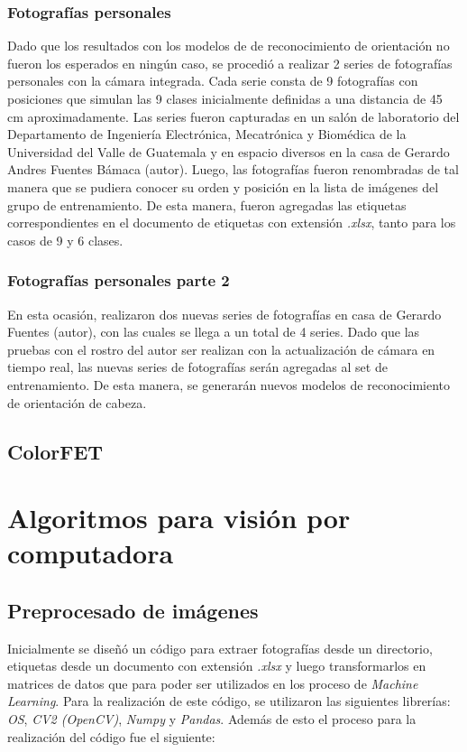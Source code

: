 \subsection{Fotografías personales}
Dado que los resultados con los modelos de de reconocimiento de orientación no fueron los esperados en ningún caso, se procedió a realizar 2 series de fotografías personales con la cámara integrada. Cada serie consta de 9 fotografías con posiciones que simulan las 9 clases inicialmente definidas a una distancia de 45 cm aproximadamente. Las series fueron capturadas en un salón de laboratorio del Departamento de Ingeniería Electrónica, Mecatrónica y Biomédica de la Universidad del Valle de Guatemala y en espacio diversos en la casa de Gerardo Andres Fuentes Bámaca (autor). Luego, las fotografías fueron renombradas de tal manera que se pudiera conocer su orden y posición en la lista de imágenes del grupo de entrenamiento. De esta manera, fueron agregadas las etiquetas correspondientes en el documento de etiquetas con extensión \textit{.xlsx}, tanto para los casos de 9 y 6 clases.

\subsection{Fotografías personales parte 2}
En esta ocasión, realizaron dos nuevas series de fotografías en casa de Gerardo Fuentes (autor), con las cuales se llega a un total de 4 series. Dado que las pruebas con el rostro del autor ser realizan con la actualización de cámara en tiempo real, las nuevas series de fotografías serán agregadas al set de entrenamiento. De esta manera, se generarán nuevos modelos de reconocimiento de orientación de cabeza. 



\section{ColorFET}
\chapter{Algoritmos para visión por computadora}
\section{Preprocesado de imágenes}
Inicialmente se diseñó un código para extraer fotografías desde un directorio, etiquetas desde un documento con extensión \textit{.xlsx} y luego transformarlos en matrices de datos que para poder ser utilizados en los proceso de \textit{Machine Learning}. Para la realización de este código, se utilizaron las siguientes librerías: \textit{OS}, \textit{CV2 (OpenCV)}, \textit{Numpy} y \textit{Pandas}. Además de esto el proceso para la realización del código fue el siguiente: 

